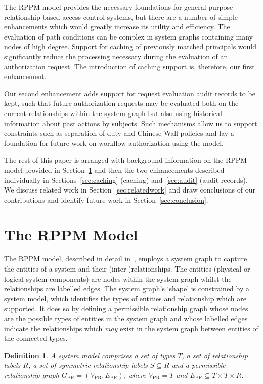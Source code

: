 \documentclass{article}
\newtheorem{definition}{Definition}
\begin{document}
The RPPM model provides the necessary foundations for general purpose relationship-based access control systems, but there are a number of simple enhancements which would greatly increase its utility and efficiency.
The evaluation of path conditions can be complex in system graphs containing many nodes of high degree.
Support for caching of previously matched principals would significantly reduce the processing necessary during the evaluation of an authorization request.
The introduction of caching support is, therefore, our first enhancement.

Our second enhancement adds support for request evaluation audit records to be kept, such that future authorization requests may be evaluated both on the current relationships within the system graph but also using historical information about past actions by subjects.
Such mechanisms allow us to support constraints such as separation of duty and Chinese Wall policies and lay a foundation for future work on workflow authorization using the model.

The rest of this paper is arranged with background information on the RPPM model provided in Section~\ref{sec:preliminaries} and then the two enhancements described individually in Sections~\ref{sec:caching} (caching) and~\ref{sec:audit} (audit records).
We discuss related work in Section~\ref{sec:relatedwork} and draw conclusions of our contributions and identify future work in Section~\ref{sec:conclusion}.

\section{The RPPM Model}\label{sec:preliminaries}
The RPPM model, described in detail in~\cite{CramptonS14}, employs a system graph to capture the entities of a system and their (inter-)relationships. The entities (physical or logical system components) are nodes within the system graph whilst the relationships are labelled edges. The system graph's `shape' is constrained by a system model, which identifies the types of entities and relationship which are supported. It does so by defining a permissible relationship graph whose nodes are the possible types of entities in the system graph and whose labelled edges indicate the relationships which \emph{may} exist in the system graph between entities of the connected types.

\begin{definition}
    A \emph{system model} comprises a set of types $T$, a set of relationship labels $R$, a set of \emph{symmetric} relationship labels $S \subseteq R$ and a \emph{permissible relationship graph} $G_{\textrm{PR}} = (V_{\textrm{PR}},E_{\textrm{PR}})$, where $V_{\textrm{PR}} = T$ and $E_{\textrm{PR}} \subseteq T \times T \times R$.
\end{definition}
\end{document}

